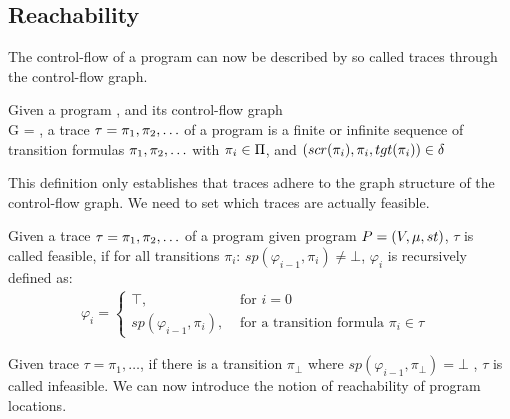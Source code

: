 \subsection{Reachability}
The control-flow of a program can now be described by so called traces through the control-flow graph.
\begin{mydef}
	Given a program	\prg, and its control-flow graph \\ G = \cfg, a trace $\tau = \pi_1, \pi_2, \ldots $ of a program is a finite or infinite sequence of transition formulas $\pi_1, \pi_2, \ldots$ with $\pi_i \in \Pi$, and $(scr(\pi_i), \pi_i, tgt(\pi_i)) \in \delta$
\end{mydef}
This definition only establishes that traces adhere to the graph structure of the control-flow graph. We need to set which traces are actually feasible.
\begin{mydef}
	Given a trace $\tau = \pi_1, \pi_2, \ldots $ of a program given program $P = (V, \mu, st)$, $\tau$ is called feasible, if for all transitions $\pi_i$: $sp(\varphi_{i-1}, \pi_i) \neq \bot$, $\varphi_i$ is recursively defined as: 
	\begin{align*}
		\varphi_i = 
		\begin{cases}
			\textbf{$\top$}, & \text{ for } i = 0 \\
			\textbf{$sp(\varphi_{i-1}, \pi_i)$}, & \text{ for a transition formula $\pi_i \in \tau$ }
		\end{cases}
	\end{align*}
\end{mydef}
Given trace $\tau = \pi_1, \ldots$, if there is a transition $\pi_{\bot}$ where $sp(\varphi_{i-1}, \pi_{\bot}) = \bot$ , $\tau$ is called infeasible. We can now introduce the notion of reachability of program locations.
\begin{comment}
	\begin{mydef}[Reachability]
	Given a control-flow graph $\cfg$, we introduce a map $reach: Loc \mapsto \{\varphi\}$ that maps each program location $\ell_i \in Loc$ to a set of states, defined by first order logic formula $\varphi_i$, that are reachable from $\ell_i$. The set of states $\{\varphi_i\}$ is defined as the union $\bigcup\limits_{}^{\tau_j} sp(\varphi_{k-1}, \pi_k)$ for given traces $\tau_j = \pi_1, \ldots, \pi_k$ where $tgt(\pi_k) = \ell_i$. A program location $\ell_i$ is called reachable, if $reach(\ell_i) \neq \{\bot\}$, otherwise $\ell_i$ is called unreachable.
	\end{mydef}
\end{comment}
